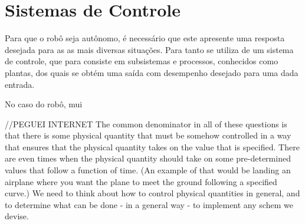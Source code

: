 \vspace{1cm}
\section{Sistemas de Controle} \label{cap:controle}

Para que o robô seja autônomo, %
é necessário que este apresente uma resposta desejada para as 
as mais diversas situações. Para tanto se utiliza de um sistema de controle, que para  consiste em subsistemas e 
processos, conhecidos como plantas, dos quais se obtém uma saída com desempenho desejado para uma dada entrada.

No caso do robô, mui

//PEGUEI INTERNET
The common denominator in all of these questions is that there is some physical quantity that must be somehow controlled in a way 
that ensures that the physical quantity takes on the value that is specified.  There are even times when the physical quantity should 
take on some pre-determined values that follow a function of time.  (An example of that would be landing an airplane where you want the 
plane to meet the ground following a specified curve.)  We need to think about how to control physical quantities in general, and to 
determine what can be done - in a general way - to implement any schem we devise.

